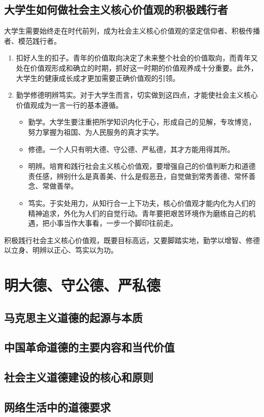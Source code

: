 \subsection{大学生如何做社会主义核心价值观的积极践行者}
大学生需要始终走在时代前列，成为社会主义核心价值观的坚定信仰者、积极传播者、模范践行者。
\begin{enumerate}
\item 扣好人生的扣子。青年的价值取向决定了未来整个社会的价值取向，而青年又处在价值观形成和确立的时期，抓好这一时期的价值观养成十分重要。此外，大学生的健康成长成才更加需要正确价值观的引领。
\item 勤学修德明辨笃实。对于大学生而言，切实做到这四点，才能使社会主义核心价值观成为一言一行的基本遵循。
\begin{itemize}
\item 勤学。大学生要注重把所学知识内化于心，形成自己的见解，专攻博览，努力掌握为祖国、为人民服务的真才实学。
\item 修德。一个人只有明大德、守公德、严私德，其才方能用得其所。
\item 明辨。培育和践行社会主义核心价值观，要增强自己的价值判断力和道德责任感，辨别什么是真善美、什么是假恶丑，自觉做到常秀善德、常怀善念、常做善举。
\item 笃实。于实处用力，从知行合一上下功夫，核心价值观才能内化为人们的精神追求，外化为人们的自觉行动。青年要把艰苦环境作为磨练自己的机遇，把小事当作大事看，一步一个脚印往前走。
\end{itemize}
\end{enumerate}

积极践行社会主义核心价值观，既要目标高远，又要脚踏实地，勤学以增智、修德以立身、明辨以正心、笃实以为功。

\section{明大德、守公德、严私德}
\subsection{马克思主义道德的起源与本质}
\subsection{中国革命道德的主要内容和当代价值}
\subsection{社会主义道德建设的核心和原则}
\subsection{网络生活中的道德要求}

